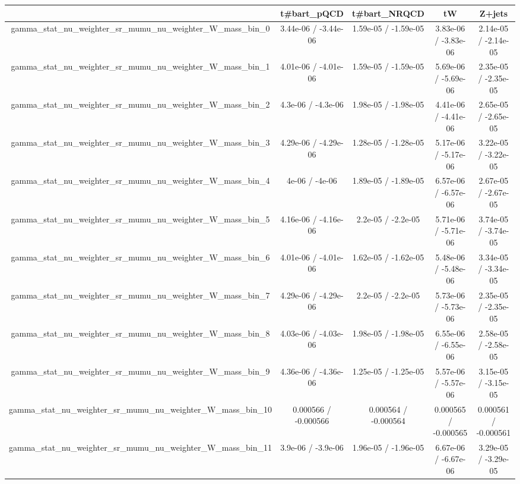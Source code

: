 \documentclass[10pt]{article}
\begin{document}
\begin{table}[htbp]
\begin{center}
\begin{tabular}{|c|c|c|c|c|}
\hline 
      & t#bar{t}_{pQCD}      & t#bar{t}_{NRQCD}      & tW      & Z+jets \\ 
\hline 
  gamma_stat_nu_weighter_sr_mumu_nu_weighter_W_mass_bin_0 & 3.44e-06 / -3.44e-06 & 1.59e-05 / -1.59e-05 & 3.83e-06 / -3.83e-06 & 2.14e-05 / -2.14e-05 \\ 
  gamma_stat_nu_weighter_sr_mumu_nu_weighter_W_mass_bin_1 & 4.01e-06 / -4.01e-06 & 1.59e-05 / -1.59e-05 & 5.69e-06 / -5.69e-06 & 2.35e-05 / -2.35e-05 \\ 
  gamma_stat_nu_weighter_sr_mumu_nu_weighter_W_mass_bin_2 & 4.3e-06 / -4.3e-06 & 1.98e-05 / -1.98e-05 & 4.41e-06 / -4.41e-06 & 2.65e-05 / -2.65e-05 \\ 
  gamma_stat_nu_weighter_sr_mumu_nu_weighter_W_mass_bin_3 & 4.29e-06 / -4.29e-06 & 1.28e-05 / -1.28e-05 & 5.17e-06 / -5.17e-06 & 3.22e-05 / -3.22e-05 \\ 
  gamma_stat_nu_weighter_sr_mumu_nu_weighter_W_mass_bin_4 & 4e-06 / -4e-06 & 1.89e-05 / -1.89e-05 & 6.57e-06 / -6.57e-06 & 2.67e-05 / -2.67e-05 \\ 
  gamma_stat_nu_weighter_sr_mumu_nu_weighter_W_mass_bin_5 & 4.16e-06 / -4.16e-06 & 2.2e-05 / -2.2e-05 & 5.71e-06 / -5.71e-06 & 3.74e-05 / -3.74e-05 \\ 
  gamma_stat_nu_weighter_sr_mumu_nu_weighter_W_mass_bin_6 & 4.01e-06 / -4.01e-06 & 1.62e-05 / -1.62e-05 & 5.48e-06 / -5.48e-06 & 3.34e-05 / -3.34e-05 \\ 
  gamma_stat_nu_weighter_sr_mumu_nu_weighter_W_mass_bin_7 & 4.29e-06 / -4.29e-06 & 2.2e-05 / -2.2e-05 & 5.73e-06 / -5.73e-06 & 2.35e-05 / -2.35e-05 \\ 
  gamma_stat_nu_weighter_sr_mumu_nu_weighter_W_mass_bin_8 & 4.03e-06 / -4.03e-06 & 1.98e-05 / -1.98e-05 & 6.55e-06 / -6.55e-06 & 2.58e-05 / -2.58e-05 \\ 
  gamma_stat_nu_weighter_sr_mumu_nu_weighter_W_mass_bin_9 & 4.36e-06 / -4.36e-06 & 1.25e-05 / -1.25e-05 & 5.57e-06 / -5.57e-06 & 3.15e-05 / -3.15e-05 \\ 
  gamma_stat_nu_weighter_sr_mumu_nu_weighter_W_mass_bin_10 & 0.000566 / -0.000566 & 0.000564 / -0.000564 & 0.000565 / -0.000565 & 0.000561 / -0.000561 \\ 
  gamma_stat_nu_weighter_sr_mumu_nu_weighter_W_mass_bin_11 & 3.9e-06 / -3.9e-06 & 1.96e-05 / -1.96e-05 & 6.67e-06 / -6.67e-06 & 3.29e-05 / -3.29e-05 \\ 

\end{tabular}
\end{center}
\end{table}
\end{document}
